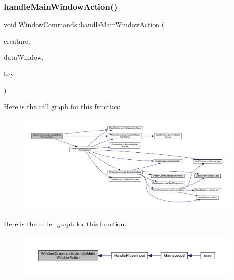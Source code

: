 \subsubsection{\texorpdfstring{handle\+Main\+Window\+Action()}{handleMainWindowAction()}}
{\footnotesize\ttfamily void Window\+Commands\+::handle\+Main\+Window\+Action (\begin{DoxyParamCaption}\item[{\mbox{\hyperlink{class_base_creature}{Base\+Creature}} \&}]{creature,  }\item[{\mbox{\hyperlink{class_data_window}{Data\+Window}} \&}]{data\+Window,  }\item[{sf\+::\+Keyboard\+::\+Key}]{key }\end{DoxyParamCaption})}

Here is the call graph for this function\+:
\nopagebreak
\begin{figure}[H]
\begin{center}
\leavevmode
\includegraphics[width=350pt]{da/d07/class_window_commands_ac4a64479853dfa15653a7690403815b7_cgraph}
\end{center}
\end{figure}
Here is the caller graph for this function\+:
\nopagebreak
\begin{figure}[H]
\begin{center}
\leavevmode
\includegraphics[width=350pt]{da/d07/class_window_commands_ac4a64479853dfa15653a7690403815b7_icgraph}
\end{center}
\end{figure}
\mbox{\label{class_window_commands_a9b124a88e3af586738fe6b3cbce6fda2}} 
